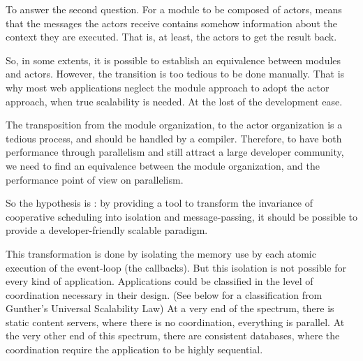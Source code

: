 To answer the second question.
For a module to be composed of actors, means that the messages the actors receive contains somehow information about the context they are executed.
That is, at least, the actors to get the result back.

So, in some extents, it is possible to establish an equivalence between modules and actors. However, the transition is too tedious to be done manually.
That is why most web applications neglect the module approach to adopt the actor approach, when true scalability is needed.
At the lost of the development ease.











The transposition from the module organization, to the actor organization is a tedious process, and should be handled by a compiler.
Therefore, to have both performance through parallelism and still attract a large developer community, we need to find an equivalence between the module organization, and the performance point of view on parallelism.


So the hypothesis is : by providing a tool to transform the invariance of cooperative scheduling into isolation and message-passing, it should be possible to provide a developer-friendly scalable paradigm.

This transformation is done by isolating the memory use by each atomic execution of the event-loop (the callbacks).
But this isolation is not possible for every kind of application.
Applications could be classified in the level of coordination necessary in their design. (See below for a classification from Gunther's Universal Scalability Law)
At a very end of the spectrum, there is static content servers, where there is no coordination, everything is parallel.
At the very other end of this spectrum, there are consistent databases, where the coordination require the application to be highly sequential.

